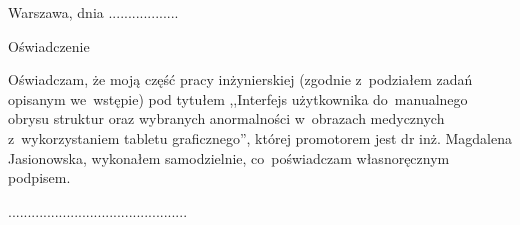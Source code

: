 \documentclass[a4paper,11pt,twoside,openright]{report}
\theoremstyle{definition}
\newcommand{\tytul}{Interfejs użytkownika do~manualnego obrysu struktur oraz wybranych anormalności w~obrazach medycznych z~wykorzystaniem tabletu graficznego}
\renewcommand{\title}{User interface for graphic tablet interactions for contouring of~structures and selected abnormalities in~medical images}
\newcommand{\type}{inżyniers} %
\newcommand{\supervisor}{dr inż. Magdalena Jasionowska}
\begin{document}
{
\begin{abstract}

The following document describes bachelor's thesis on~"\title".
Authors’ goal was~to~create a~digital tool that allows to~manually draw and semi-automatically generate
contours of anatomical structures and lesions on~medical images.
This tool can be used by medical doctors for diagnostic purposes and by medical engineers
for scientific purposes. The topics discussed include:
DICOM standard, analysis of~state-of-the-art systems and tools used for~viewing
and creating contours on~DICOM medical images, system's architecture and experiments
conducted simultaneously with the creation of~the tool.

The architecture used enables simultaneous use of~the tool by~many users.
Manual contour module had mainly been implemented in part connected with user interface.
Semi-automatic contour module is based on the algorithm developed for the~purpose of~generating contours, that uses Canny's
Operator and the algorithm searching for the shortest path in~the graph.
Additionally statistics module was added which allows to calculate basic statistical measurements,
describing contoured regions of interest in the images.
\\
\\
\noindent \textbf{Keywords:} user interface, graphics tablet, medical images, DICOM,
contour, statistics of~image data, IT~system, REST~API interface, edge detection, contour generation
\end{abstract}
}




\null\thispagestyle{empty}\newpage

\null \hfill Warszawa, dnia ..................\\

\par\vspace{5cm}

\begin{center}
Oświadczenie
\end{center}

\indent Oświadczam, że moją część pracy \type kiej
(zgodnie z~podziałem zadań opisanym we~wstępie) pod
tytułem ,,\tytul '', której promotorem jest \supervisor , wykonałem
samodzielnie, co~poświadczam własnoręcznym podpisem.
\vspace{2cm}


\begin{flushright}
  \begin{minipage}{50mm}
    \begin{center}
      ..............................................

    \end{center}
  \end{minipage}
\end{flushright}
\end{document}
